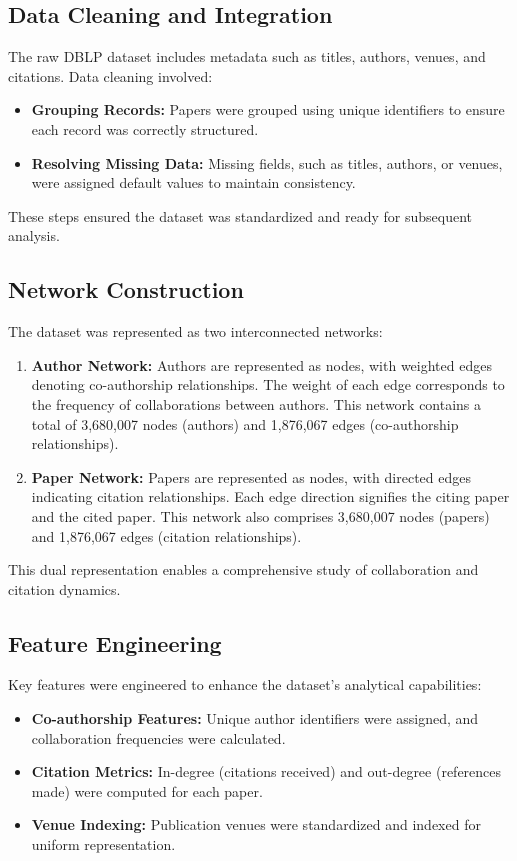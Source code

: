 \documentclass[11pt]{article}
\begin{document}
\subsection{Data Cleaning and Integration}

The raw DBLP dataset includes metadata such as titles, authors, venues, and citations. Data cleaning involved:
\begin{itemize}
	\item \textbf{Grouping Records:} Papers were grouped using unique identifiers to ensure each record was correctly structured.
	\item \textbf{Resolving Missing Data:} Missing fields, such as titles, authors, or venues, were assigned default values to maintain consistency.
\end{itemize}

These steps ensured the dataset was standardized and ready for subsequent analysis.

\subsection{Network Construction}

The dataset was represented as two interconnected networks:
\begin{enumerate}
	\item \textbf{Author Network:} Authors are represented as nodes, with weighted edges denoting co-authorship relationships. The weight of each edge corresponds to the frequency of collaborations between authors. This network contains a total of 3,680,007 nodes (authors) and 1,876,067 edges (co-authorship relationships).
	\item \textbf{Paper Network:} Papers are represented as nodes, with directed edges indicating citation relationships. Each edge direction signifies the citing paper and the cited paper. This network also comprises 3,680,007 nodes (papers) and 1,876,067 edges (citation relationships).
\end{enumerate}

This dual representation enables a comprehensive study of collaboration and citation dynamics.

\subsection{Feature Engineering}

Key features were engineered to enhance the dataset’s analytical capabilities:
\begin{itemize}
	\item \textbf{Co-authorship Features:} Unique author identifiers were assigned, and collaboration frequencies were calculated.
	\item \textbf{Citation Metrics:} In-degree (citations received) and out-degree (references made) were computed for each paper.
	\item \textbf{Venue Indexing:} Publication venues were standardized and indexed for uniform representation.
\end{itemize}
\end{document}
